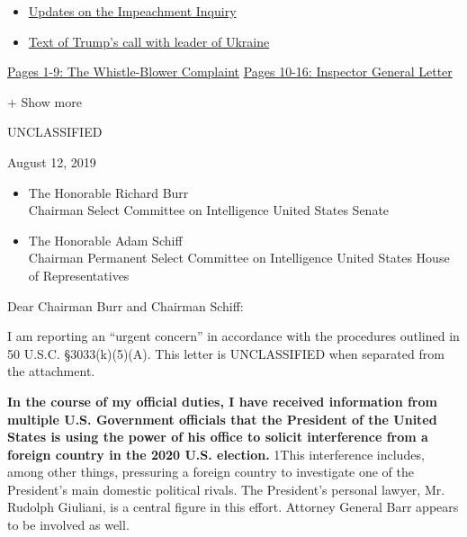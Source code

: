 \begin{itemize}
\tightlist
\item
  \href{https://www.nytimes.com/2019/09/26/us/trump-ukraine-whistleblower-guide.html}{Updates
  on the Impeachment Inquiry}
\item
  \href{https://www.nytimes.com/interactive/2019/09/25/us/politics/trump-ukraine-transcript.html}{Text
  of Trump's call with leader of Ukraine}
\end{itemize}

\protect\hyperlink{g-page-1}{Pages 1-9: The Whistle-Blower Complaint}
\protect\hyperlink{g-page-10}{Pages 10-16: Inspector General Letter}

+ Show more

UNCLASSIFIED

August 12, 2019

\begin{itemize}
\tightlist
\item
  The Honorable Richard Burr\\
  Chairman Select Committee on Intelligence United States Senate
\end{itemize}

\begin{itemize}
\tightlist
\item
  The Honorable Adam Schiff\\
  Chairman Permanent Select Committee on Intelligence United States
  House of Representatives
\end{itemize}

Dear Chairman Burr and Chairman Schiff:

I am reporting an ``urgent concern'' in accordance with the procedures
outlined in 50 U.S.C. §3033(k)(5)(A). This letter is UNCLASSIFIED when
separated from the attachment.

\textbf{In the course of my official duties, I have received information
from multiple U.S. Government officials that the President of the United
States is using the power of his office to solicit interference from a
foreign country in the 2020 U.S. election.} 1This interference includes,
among other things, pressuring a foreign country to investigate one of
the President's main domestic political rivals. The President's personal
lawyer, Mr. Rudolph Giuliani, is a central figure in this effort.
Attorney General Barr appears to be involved as well.

